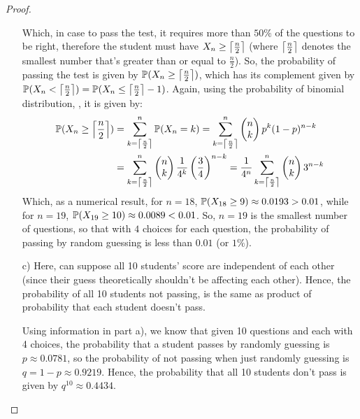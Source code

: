 \documentclass{article}
\begin{document}
\begin{proof}
\begin{itemize}
        Which, in case to pass the test, it requires more than $50\%$ of the questions to be right, therefore the student must have $X_n\geq \ceil*{\frac{n}{2}}$ (where $\ceil*{\frac{n}{2}}$ denotes the smallest number that's greater than or equal to $\frac{n}{2}$). So, the probability of passing the test is given by $\PP(X_n\geq \ceil*{\frac{n}{2}})$, which has its complement given by $\PP(X_n<\ceil*{\frac{n}{2}}) = \PP(X_n\leq \ceil*{\frac{n}{2}}-1)$. Again, using the probability of binomial distribution, , it is given by:
        \begin{align}
            \PP(X_n\geq \ceil*{\frac{n}{2}}) &= \sum_{k=\ceil*{\frac{n}{2}}}^{n}\PP(X_n=k) = \sum_{k=\ceil*{\frac{n}{2}}}^{n}\begin{pmatrix}n\\k\end{pmatrix} p^k (1-p)^{n-k}\\ 
            &= \sum_{k=\ceil*{\frac{n}{2}}}^{n}\begin{pmatrix}n\\k\end{pmatrix} \frac{1}{4^k} \left(\frac{3}{4}\right)^{n-k} = \frac{1}{4^n}\sum_{k=\ceil*{\frac{n}{2}}}^{n} \begin{pmatrix}n\\k\end{pmatrix} 3^{n-k}
        \end{align}
        Which, as a numerical result, for $n=18$, $\PP(X_{18}\geq 9) \approx 0.0193> 0.01$, while for $n=19$, $\PP(X_{19}\geq 10) \approx 0.0089 < 0.01$. So, $n=19$ is the smallest number of questions, so that with $4$ choices for each question, the probability of passing by random guessing is less than $0.01$ (or $1\%$).
        
        \hfil

        \item[c)] Here, can suppose all 10 students' score are independent of each other (since their guess theoretically shouldn't be affecting each other). Hence, the probability of all 10 students not passing, is the same as product of probability that each student doesn't pass. 
        
        Using information in part a), we know that given 10 questions and each with 4 choices, the probability that a student passes by randomly guessing is $p\approx 0.0781$, so the probability of not passing when just randomly guessing is $q = 1-p\approx 0.9219$. Hence, the probability that all 10 students don't pass is given by $q^{10} \approx 0.4434$.
    \end{itemize}
\end{proof}
\end{document}
